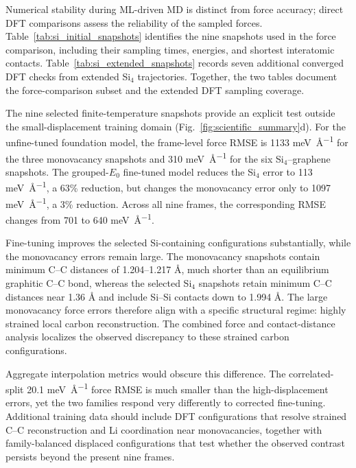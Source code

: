 


Numerical stability during ML-driven MD is distinct from force accuracy;
direct DFT comparisons assess the reliability of the sampled forces.
Table~\ref{tab:si_initial_snapshots} identifies the nine snapshots used
in the force comparison, including their sampling times, energies, and
shortest interatomic contacts. Table~\ref{tab:si_extended_snapshots} records
seven additional converged DFT checks from extended Si$_4$ trajectories.
Together, the two tables document the force-comparison subset and the extended
DFT sampling coverage.




The nine selected finite-temperature snapshots provide an explicit test outside
the small-displacement training domain (Fig.~\ref{fig:scientific_summary}d).
For the unfine-tuned foundation model, the frame-level force RMSE is
1133 \si{\milli\electronvolt\per\angstrom} for the three monovacancy snapshots and
310 \si{\milli\electronvolt\per\angstrom} for the six Si$_4$--graphene snapshots. The grouped-$E_0$
fine-tuned model reduces the Si$_4$ error to 113 \si{\milli\electronvolt\per\angstrom}, a 63\%
reduction, but changes the monovacancy error only to
1097 \si{\milli\electronvolt\per\angstrom}, a 3\% reduction. Across all nine frames, the corresponding
RMSE changes from 701 to 640 \si{\milli\electronvolt\per\angstrom}.

Fine-tuning improves the selected Si-containing configurations substantially,
while the monovacancy errors remain large. The
monovacancy snapshots contain minimum C--C distances of 1.204--1.217 \AA{}, much
shorter than an equilibrium graphitic C--C bond, whereas the selected Si$_4$
snapshots retain minimum C--C distances near 1.36 \AA{} and include Si--Si
contacts down to 1.994 \AA{}. The large monovacancy force errors therefore align
with a specific structural regime: highly strained local carbon reconstruction.
The combined force and contact-distance analysis localizes the observed
discrepancy to these strained carbon configurations.

Aggregate interpolation metrics would obscure this difference. The
correlated-split 20.1 \si{\milli\electronvolt\per\angstrom} force RMSE is much smaller than the
high-displacement errors, yet the two families respond
very differently to corrected fine-tuning. Additional training data should
include DFT configurations that resolve strained C--C
reconstruction and Li coordination near monovacancies, together with
family-balanced displaced configurations that test whether the observed
contrast persists beyond the present nine frames.

